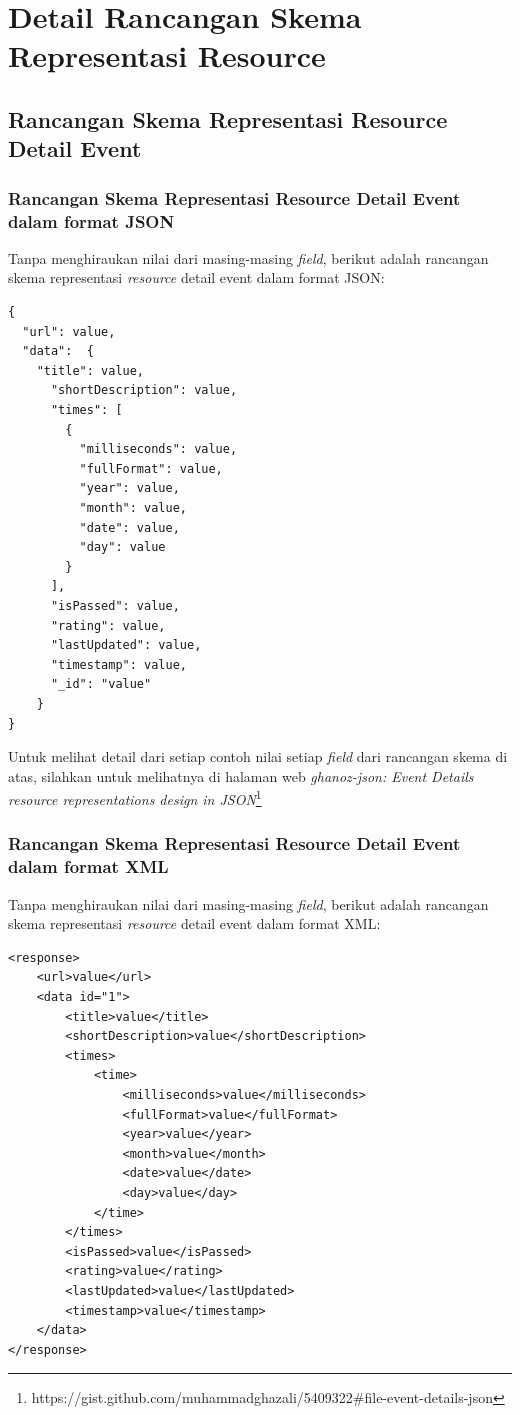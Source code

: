 \documentclass[a4paper, 12pt, oneside]{report}
\begin{document}
\chapter{Detail Rancangan Skema Representasi Resource} \label{lampiran-detail-rancangan-skema-representasi-res}
\section{Rancangan Skema Representasi Resource Detail Event}
\subsection{Rancangan Skema Representasi Resource Detail Event dalam format JSON}
\onehalfspacing Tanpa menghiraukan nilai dari masing-masing \textit{field}, berikut adalah rancangan skema representasi \textit{resource} detail event dalam format JSON:

\begin{lstlisting}[frame=single]
{
  "url": value,
  "data":  {
    "title": value,
      "shortDescription": value,
      "times": [
        {
          "milliseconds": value,
          "fullFormat": value,
          "year": value,
          "month": value,
          "date": value,
          "day": value
        }
      ],
      "isPassed": value,
      "rating": value,
      "lastUpdated": value,
      "timestamp": value,
      "_id": "value"
    }
}
\end{lstlisting}

\onehalfspacing Untuk melihat detail dari setiap contoh nilai setiap \textit{field} dari rancangan skema di atas, silahkan untuk melihatnya di halaman web \textit{ghanoz-json: Event Details resource representations design in JSON}\footnote{https://gist.github.com/muhammadghazali/5409322\#file-event-details-json}

\subsection{Rancangan Skema Representasi Resource Detail Event dalam format XML}
\onehalfspacing Tanpa menghiraukan nilai dari masing-masing \textit{field}, berikut adalah rancangan skema representasi \textit{resource} detail event dalam format XML:

\begin{lstlisting}[frame=single]
<response>
    <url>value</url>
    <data id="1">
        <title>value</title>
        <shortDescription>value</shortDescription>
        <times>
            <time>
                <milliseconds>value</milliseconds>
                <fullFormat>value</fullFormat>
                <year>value</year>
                <month>value</month>
                <date>value</date>
                <day>value</day>
            </time>
        </times>
        <isPassed>value</isPassed>
        <rating>value</rating>
        <lastUpdated>value</lastUpdated>
        <timestamp>value</timestamp>
    </data>
</response>
\end{lstlisting}
\end{document}
